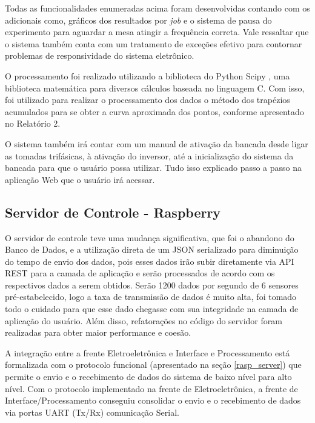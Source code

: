 Todas as funcionalidades enumeradas acima foram desenvolvidas contando com os adicionais como,
gráficos dos resultados por \textit{job} e o sistema de pausa do experimento para aguardar a mesa atingir a frequência correta.
Vale ressaltar que o sistema também conta com um tratamento de exceções efetivo para contornar problemas de responsividade do
sistema eletrônico.

O processamento foi realizado utilizando a biblioteca do Python Scipy \footnotemark, uma biblioteca matemática para
diversos cálculos baseada no linguagem C. Com isso, foi utilizado para realizar o processamento dos dados
o método dos trapézios acumulados para se obter a curva aproximada dos pontos, conforme apresentado no Relatório 2.

O sistema também irá contar com um manual de ativação da bancada desde ligar as tomadas trifásicas,
à ativação do inversor, até a inicialização do sistema da bancada para que o usuário possa utilizar. 
Tudo isso explicado passo a passo na aplicação Web que o usuário irá acessar.

\subsection{Servidor de Controle - Raspberry} \label{servidor_controle}

O servidor de controle teve uma mudança significativa, que foi o abandono do Banco de Dados, e a utilização direta de um JSON serializado para diminuição do tempo de envio dos dados, pois esses dados irão subir diretamente via API REST para a camada de aplicação e serão processados de acordo com os respectivos dados a serem obtidos. Serão 1200 dados por segundo de 6 sensores pré-estabelecido, logo a taxa de transmissão de dados é muito alta, foi tomado todo o cuidado para que esse dado chegasse com sua integridade na camada de aplicação do usuário.
Além disso, refatorações no código do servidor foram realizadas para obter maior performance e coesão.

A integração entre a frente Eletroeletrônica e Interface e Processamento está formalizada com o protocolo funcional (apresentado na seção \ref{rasp_server}) que permite o envio e o recebimento de dados do sistema de baixo nível para alto nível. Com o protocolo implementado na frente de Eletroeletrônica, a frente de Interface/Processamento conseguiu consolidar o envio e o recebimento de dados via portas UART (Tx/Rx) comunicação Serial.

